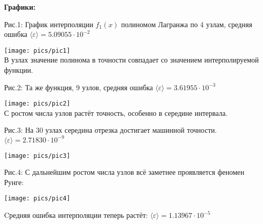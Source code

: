 \documentclass[a4paper, 14pt]{article}
\begin{document}

{\huge{\bf{Графики:}}}

\vspace{-0.5cm}
{\normalsize Рис.1: График интерполяции $f_1(x)$ полиномом Лагранжа по 4 узлам, средняя ошибка  $\langle\varepsilon\rangle=5.09055\cdot10^{-2}$}

\begin{center}
    \texttt{[image: pics/pic1]}\\
    \vspace{-0.7cm}
    {\small В узлах значение полинома в точности совпадает со значением интерполируемой функции.}
\end{center}

\vspace{-0.5cm}
{\normalsize Рис.2: Та же функция, 9 узлов, средняя ошибка $\langle\varepsilon\rangle=3.61955\cdot10^{-3}$}
\begin{center}
    \texttt{[image: pics/pic2]}\\
    \vspace{-0.7cm}
    {\small С ростом числа узлов растёт точность, особенно в середине интервала.}
\end{center}


{\normalsize Рис.3: На $30$ узлах середина отрезка достигает машинной точности. $\langle\varepsilon\rangle = 2.71830\cdot10^{-9}$}
\begin{center}
    \texttt{[image: pics/pic3]}\\
\end{center}

{\normalsize Рис.4: С дальнейшим ростом числа узлов всё заметнее проявляется феномен Рунге:
\begin{center}
    \texttt{[image: pics/pic4]}\\
    \vspace{-0.7cm}
\end{center}
Cредняя ошибка интерполяции теперь растёт: $\langle\varepsilon\rangle = 1.13967\cdot10^{-5}$}
\end{document}
